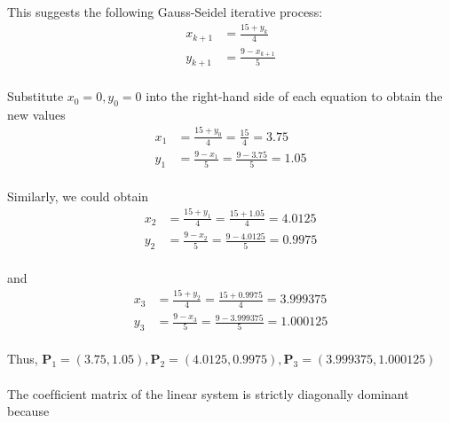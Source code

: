 \documentclass{article}  %
\begin{document}
        \paragraph{}This suggests the following Gauss-Seidel iterative process:
        \begin{align*}
            x_{k+1} &= \frac{15 + y_k}{4} \\
            y_{k+1} &= \frac{9 - x_{k+1}}{5}
        \end{align*}
        \paragraph{}Substitute $x_0 = 0, y_0 = 0$ into the right-hand side of each equation to obtain the new values
        \begin{align*}
            x_{1} &= \frac{15 + y_0}{4} = \frac{15}{4} = 3.75 \\
            y_{1} &= \frac{9 - x_1}{5} = \frac{9 - 3.75}{5} = 1.05
        \end{align*}
        \paragraph{}Similarly, we could obtain 
        \begin{align*}
            x_{2} &= \frac{15 + y_1}{4} = \frac{15 + 1.05}{4} = 4.0125 \\
            y_{2} &= \frac{9 - x_2}{5} = \frac{9 - 4.0125}{5} = 0.9975
        \end{align*}
        \paragraph{}and
        \begin{align*}
            x_{3} &= \frac{15 + y_2}{4} = \frac{15 + 0.9975}{4} = 3.999375 \\
            y_{3} &= \frac{9 - x_3}{5} = \frac{9 - 3.999375}{5} = 1.000125‬
        \end{align*}
        \paragraph{}Thus, $\bm{P}_1 = (3.75, 1.05), \bm{P}_2 = (4.0125, 0.9975), \bm{P}_3 = (3.999375, 1.000125‬)$
        \paragraph{}The coefﬁcient matrix of the linear system is strictly diagonally dominant because
\end{document}
